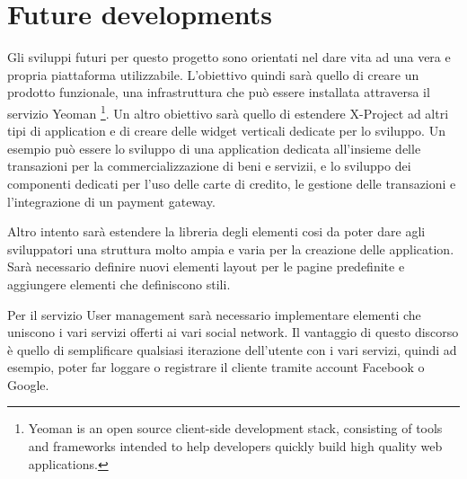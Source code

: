 \section{Future developments}
\label{sec:conclusions_future_developments}

Gli sviluppi futuri per questo progetto sono orientati nel dare vita ad una vera e propria piattaforma utilizzabile. L'obiettivo quindi sarà quello di creare un prodotto funzionale, una infrastruttura che può essere installata attraversa il servizio Yeoman \footnote{Yeoman is an open source client-side development stack, consisting of tools and frameworks intended to help developers quickly build high quality web applications.}.
Un altro obiettivo sarà quello di estendere X-Project ad altri tipi di application e di creare delle widget verticali dedicate per lo sviluppo. Un esempio può essere lo sviluppo di una application dedicata all'insieme delle transazioni per la commercializzazione di beni e servizii, e lo sviluppo dei componenti dedicati per l'uso delle carte di credito, le gestione delle transazioni e l'integrazione di un payment gateway.

Altro intento sarà estendere la libreria degli elementi cosi da poter dare agli sviluppatori una struttura molto ampia e varia per la creazione delle application. Sarà necessario definire nuovi elementi layout per le pagine predefinite e aggiungere elementi che definiscono stili.

Per il servizio User management sarà necessario implementare elementi che uniscono i vari servizi offerti ai vari social network. Il vantaggio di questo discorso è quello di semplificare qualsiasi iterazione dell'utente con i vari servizi, quindi ad esempio, poter far loggare o registrare il cliente tramite account Facebook o Google.